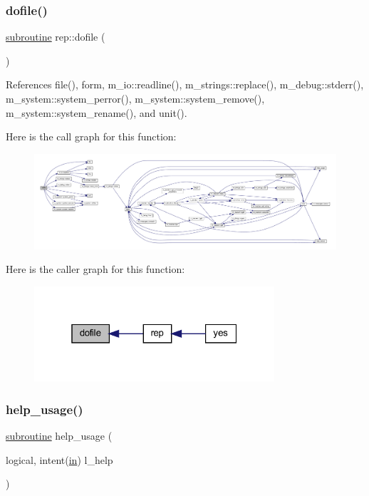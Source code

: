 \subsubsection{\texorpdfstring{dofile()}{dofile()}}
{\footnotesize\ttfamily \hyperlink{M__stopwatch_83_8txt_acfbcff50169d691ff02d4a123ed70482}{subroutine} rep\+::dofile (\begin{DoxyParamCaption}{ }\end{DoxyParamCaption})}



References file(), form, m\+\_\+io\+::readline(), m\+\_\+strings\+::replace(), m\+\_\+debug\+::stderr(), m\+\_\+system\+::system\+\_\+perror(), m\+\_\+system\+::system\+\_\+remove(), m\+\_\+system\+::system\+\_\+rename(), and unit().

Here is the call graph for this function\+:
\nopagebreak
\begin{figure}[H]
\begin{center}
\leavevmode
\includegraphics[width=350pt]{rep_8f90_a9baed1bfe8861174e553399700e95ba2_cgraph}
\end{center}
\end{figure}
Here is the caller graph for this function\+:
\nopagebreak
\begin{figure}[H]
\begin{center}
\leavevmode
\includegraphics[width=253pt]{rep_8f90_a9baed1bfe8861174e553399700e95ba2_icgraph}
\end{center}
\end{figure}
\mbox{\label{rep_8f90_a3e09a3b52ee8fb04eeb93fe5761626a8}} 
\subsubsection{\texorpdfstring{help\+\_\+usage()}{help\_usage()}}
{\footnotesize\ttfamily \hyperlink{M__stopwatch_83_8txt_acfbcff50169d691ff02d4a123ed70482}{subroutine} help\+\_\+usage (\begin{DoxyParamCaption}\item[{logical, intent(\hyperlink{M__journal_83_8txt_afce72651d1eed785a2132bee863b2f38}{in})}]{l\+\_\+help }\end{DoxyParamCaption})}




